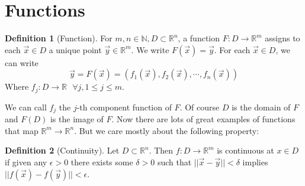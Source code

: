\documentclass{article}
\theoremstyle{definition}
\newtheorem{definition}{Definition}[section]
\begin{document}
\section{Functions}
    \begin{definition}[Function]
        For $m,n \in \mathbb{N}, D \subset \mathbb{R}^n$, a function $F: D \rightarrow \mathbb{R}^m$ assigns to 
        each $\vec x \in D$ a unique point $\vec y \in \mathbb{R}^m$.
        We write $F(\vec x) = \vec y$. For each $\vec x \in D$, we can write 
        \[
            \vec y = F(\vec x) = (f_1(\vec x), f_2(\vec x), \cdots , f_n(\vec x))
        \]
        Where $f_j: D \rightarrow \mathbb{R} \ \ \ \forall j, 1 \leqslant j \leqslant m$.
    \end{definition}
We can call $f_j$ the $j$-th component function of $F$.
Of course $D$ is the domain of $F$ and $F(D)$ is the image of $F$.
Now there are lots of great examples of functions that map $\mathbb{R}^m \rightarrow \mathbb{R}^n$.
But we care mostly about the following property:
\begin{mdframed}
    \begin{definition}[Continuity]
        Let $D \subset \mathbb{R}^n$. Then $f:D \rightarrow \mathbb{R}^m$ is 
        continuous at $x \in D$ if given any $\epsilon > 0$ there exists some $\delta > 0$
        such that $||\vec{x} - \vec y|| < \delta$ implies $||f(\vec x) - f(\vec y)|| < \epsilon$.
    \end{definition}
\end{mdframed}
\end{document}
